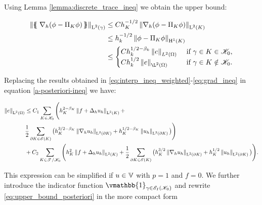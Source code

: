 \documentclass[a4paper,11pt]{article}
\begin{document}
Using Lemma \ref{lemma:discrete_trace_ineq} we obtain the upper bound:

\begin{equation}
\begin{split}
   \Norm{\avg{\nabla_{h}(\phi - \Pi_{K}\phi)}}_{\leb{2}(\gamma)} & \leq C h_{K}^{-1/2} \Norm{\nabla_{h}(
     \phi - \Pi_{K}\phi)}_{\leb{2}(K)} \\
  & \leq h_{k}^{-1/2} \Norm{\phi - \Pi_{K}\phi}_{\sobh{1}(K)}\\
  &\leq  \begin{cases}
    C h_{k}^{1/2-\beta_{k}} \Norm{e}_{L^{2}(\W)} &  \text{ if } \gamma \in K \in \cK_{0}, \\
    C h_{k}^{1/2} \Norm{e}_{\L^{2}(\W)} &  \text{ if } \gamma \in K \notin \cK_{0}.
\end{cases}
\end{split}
\label{eq:grad_ineq}
\end{equation}


Replacing the results obtained in \eqref{eq:interp_ineq_weighted}-\eqref{eq:grad_ineq} in equation \eqref{a-posteriori-ineq} we have:

\begin{equation}
\begin{split}
\left\|e\right\|_{\operatorname L^{2}(\Omega)} &\leq C_{1}\sum_{K\in \mathscr K_{0}} \Bigg( h_{K}^{2-\beta_{K}} \left\|f + \Delta_{h} u_{h}\right\|_{\operatorname L^{2}(K)} + \\
& \frac{1}{2} \sum_{\partial K \in \mathscr E(K)}  \big(h_{K}^{3/2 - \beta_{K}} \left\|\nabla_{h} u_{h}\right\|_{\operatorname L^{2}(\partial K)} + h_{K}^{1/2 - \beta_{K}} \left\|u_{h}\right\|_{\operatorname L^{2}(\partial K)} \big) \Bigg) \\
& + C_{2} \sum_{K \in \mathscr T^{} \slash \mathscr K_{0}} \Bigg( h_{K}^{2}\left\|f + \Delta_{h} u_{h}\right\|_{\operatorname L^{2}(K)} + \frac{1}{2} \sum_{\partial K \in \mathscr E(K)} \big(h_{K}^{3/2}\left\|\nabla_{h} u_{h}\right\|_{\operatorname L^{2}(\partial K)} +   h_{K}^{1/2}\left\|u_{h}\right\|_{\operatorname L^{2}(\partial K)} \big) \Bigg). 
\end{split}
\label{eq:upper_bound_posteriori}
\end{equation}

This expression can be simplified if $u \in \mathbb V$ with $p = 1$ and $f = 0$. We further introduce the indicator function $\vmathbb{1}_{\gamma \in \cE_{I}(\cK_{0})}$ and rewrite \eqref{eq:upper_bound_posteriori} in the more compact form
\end{document}
